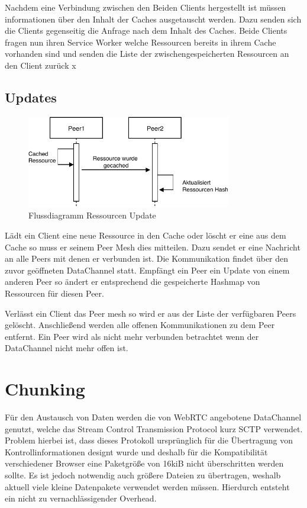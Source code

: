 \begin{description}
Nachdem eine \webrtc Verbindung zwischen den Beiden Clients hergestellt ist müssen informationen über den Inhalt der Caches ausgetauscht werden. Dazu senden sich die Clients gegenseitig die Anfrage nach dem Inhalt des Caches. Beide Clients fragen nun ihren Service Worker welche Ressourcen bereits in ihrem Cache vorhanden sind und senden die Liste der zwischengespeicherten Ressourcen an den Client zurück
x
\subsection{Updates}

\begin{figure}[!h]
	\centering
	\includegraphics[width=0.8\textwidth]{figures/Ressourcen_update}
	\caption[A Figure Short-Title]{Flussdiagramm Ressourcen Update}
	\label{fig:update_resource}
\end{figure}

Lädt ein Client eine neue Ressource in den Cache oder löscht er eine aus dem Cache so muss er seinem Peer Mesh dies mitteilen. Dazu sendet er eine Nachricht an alle Peers mit denen er verbunden ist. Die Kommunikation findet über den zuvor geöffneten \webrtc DataChannel statt. Empfängt ein Peer ein Update von einem anderen Peer so ändert er entsprechend die gespeicherte Hashmap von Ressourcen für diesen Peer.

Verlässt ein Client das Peer mesh so wird er aus der Liste der verfügbaren Peers gelöscht. Anschließend werden alle offenen Kommunikationen zu dem Peer entfernt. Ein Peer wird als nicht mehr verbunden betrachtet wenn der DataChannel nicht mehr offen ist.


\section{Chunking}
Für den Austausch von Daten werden die von WebRTC angebotene DataChannel genutzt, welche das Stream Control Transmission Protocol kurz SCTP verwendet. Problem hierbei ist, dass dieses Protokoll ursprünglich für die Übertragung von Kontrollinformationen designt wurde und deshalb für die Kompatibilität verschiedener Browser eine Paketgröße von 16kiB nicht überschritten werden sollte. Es ist jedoch notwendig auch größere Dateien zu übertragen, weshalb aktuell viele kleine Datenpakete verwendet werden müssen. Hierdurch entsteht ein nicht zu vernachlässigender Overhead.


\end{description}
